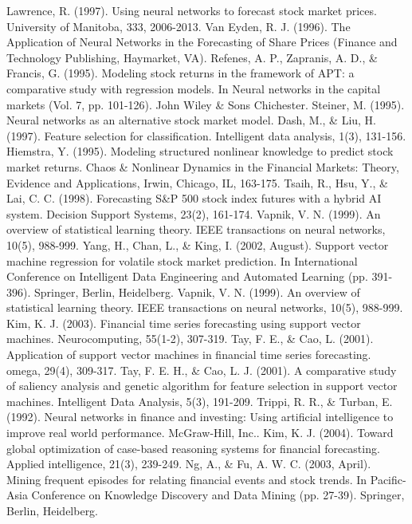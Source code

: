 \documentclass[a4paper,12pt]{report}
\begin{document}
\begin{fig}
\begin{thebibliography}{9}
	Lawrence, R. (1997). Using neural networks to forecast stock market prices. University of Manitoba, 333, 2006-2013.
	Van Eyden, R. J. (1996). The Application of Neural Networks in the Forecasting of Share Prices (Finance and Technology Publishing, Haymarket, VA).
	Refenes, A. P., Zapranis, A. D., \& Francis, G. (1995). Modeling stock returns in the framework of APT: a comparative study with regression models. In Neural networks in the capital markets (Vol. 7, pp. 101-126). John Wiley \& Sons Chichester.
	Steiner, M. (1995). Neural networks as an alternative stock market model.
	Dash, M., \& Liu, H. (1997). Feature selection for classification. Intelligent data analysis, 1(3), 131-156.
	Hiemstra, Y. (1995). Modeling structured nonlinear knowledge to predict stock market returns. Chaos \& Nonlinear Dynamics in the Financial Markets: Theory, Evidence and Applications, Irwin, Chicago, IL, 163-175.
	Tsaih, R., Hsu, Y., \& Lai, C. C. (1998). Forecasting S\&P 500 stock index futures with a hybrid AI system. Decision Support Systems, 23(2), 161-174.
	Vapnik, V. N. (1999). An overview of statistical learning theory. IEEE transactions on neural networks, 10(5), 988-999.
	Yang, H., Chan, L., \& King, I. (2002, August). Support vector machine regression for volatile stock market prediction. In International Conference on Intelligent Data Engineering and Automated Learning (pp. 391-396). Springer, Berlin, Heidelberg.
	Vapnik, V. N. (1999). An overview of statistical learning theory. IEEE transactions on neural networks, 10(5), 988-999.
	Kim, K. J. (2003). Financial time series forecasting using support vector machines. Neurocomputing, 55(1-2), 307-319.
	Tay, F. E., \& Cao, L. (2001). Application of support vector machines in financial time series forecasting. omega, 29(4), 309-317.
	Tay, F. E. H., \& Cao, L. J. (2001). A comparative study of saliency analysis and genetic algorithm for feature selection in support vector machines. Intelligent Data Analysis, 5(3), 191-209.
	Trippi, R. R., \& Turban, E. (1992). Neural networks in finance and investing: Using artificial intelligence to improve real world performance. McGraw-Hill, Inc..
	Kim, K. J. (2004). Toward global optimization of case-based reasoning systems for financial forecasting. Applied intelligence, 21(3), 239-249.
	Ng, A., \& Fu, A. W. C. (2003, April). Mining frequent episodes for relating financial events and stock trends. In Pacific-Asia Conference on Knowledge Discovery and Data Mining (pp. 27-39). Springer, Berlin, Heidelberg.

\end{thebibliography}
\end{fig}
\end{document}
